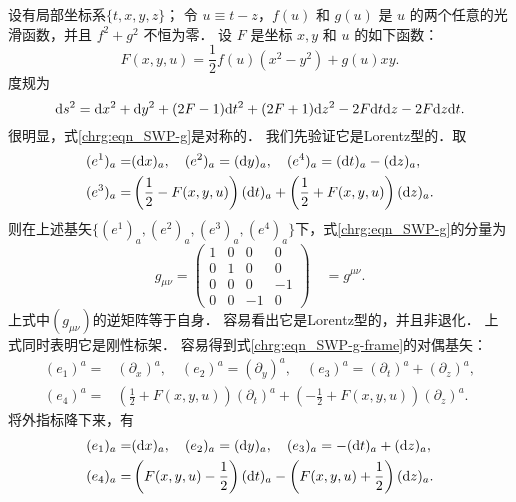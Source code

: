 设有局部坐标系$\{t, x, y, z\}$；
令 $u \equiv t-z$，$f(u)$ 和 $g(u)$ 是 $u$ 的两个任意的光滑函数，并且 $f^2+g^2$ 不恒为零．
设 $F$ 是坐标 $x, y$ 和 $u$ 的如下函数：
\begin{equation}\label{chrg:eqn_SWP-F}
	F(x, y, u)=\frac{1}{2} f(u)\left(x^2-y^2\right)+g(u) x y.
\end{equation}
度规为
\begin{equation}\label{chrg:eqn_SWP-g}
	{\rm d}s^2= {\rm d}x^2 + {\rm d}y^2
	+(2F-1) {\rm d}t^2  + (2F+1){\rm d}z^2
	- 2F {\rm d}t{\rm d}z - 2F {\rm d}z{\rm d}t.
\end{equation}
很明显，式\eqref{chrg:eqn_SWP-g}是对称的．
我们先验证它是Lorentz型的．取
\begin{equation}\label{chrg:eqn_SWP-g-frame}
	\begin{aligned}
	(e^1)_a =& ({\rm d}x)_a,\quad (e^2)_a = ({\rm d}y)_a,\quad 
	(e^4)_a = ({\rm d}t)_a -({\rm d}z)_a, \\
	(e^3)_a =& \left(\frac{1}{2}-F(x, y, u)\right)({\rm d}t)_a 
	+\left(\frac{1}{2}+F(x, y, u)\right)({\rm d}z)_a .
	\end{aligned}
\end{equation}
则在上述基矢$\{(e^1)_a,(e^2)_a,(e^3)_a,(e^4)_a\}$下，式\eqref{chrg:eqn_SWP-g}的分量为
\begin{equation}
	g_{\mu \nu}=\begin{pmatrix}
		1 & 0 & 0 & 0 \\
		0 & 1 & 0 & 0 \\
		0 & 0 & 0 & -1 \\
		0 & 0 & -1 & 0
	\end{pmatrix} \quad  = g^{\mu \nu} .
\end{equation}
上式中$(g_{\mu \nu})$的逆矩阵等于自身．
容易看出它是Lorentz型的，并且非退化．
上式同时表明它是刚性标架．
容易得到式\eqref{chrg:eqn_SWP-g-frame}的对偶基矢：
\begin{equation}
	\begin{aligned}
		(e_1)^{a} =& (\partial_x)^{a},\quad
		(e_2)^{a} = (\partial_y)^{a},    \quad
		(e_3)^{a} = (\partial_t)^{a}+(\partial_z)^{a}, \\
		(e_4)^{a} =& \left(\frac{1}{2}+F(x, y, u)\right) (\partial_t)^{a}
		+\left(-\frac{1}{2}+F(x, y, u)\right)(\partial_z)^{a}.
	\end{aligned}
\end{equation}
将外指标降下来，有
\begin{equation}
	\begin{aligned}
		(e_1)_{a}=& ({\rm d}x)_{a}, \quad		(e_2)_{a}=({\rm d}y)_{a},\quad 
		(e_3)_{a}=-({\rm d}t)_{a} +({\rm d}z)_{a}, \\
		(e_4)_{a}=&\left(F(x, y, u)-\frac{1}{2}\right) ({\rm d}t)_{a}
		- \left(F(x, y, u)+\frac{1}{2}\right) ({\rm d}z)_{a} .
	\end{aligned}
\end{equation}
